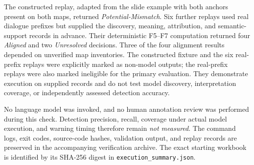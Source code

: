 The constructed replay, adapted from the slide example with both
anchors present on both maps, returned \emph{Potential-Mismatch}.
Six further replays used real dialogue prefixes but supplied the
discovery, meaning, attribution, and semantic-support records in
advance. Their deterministic F5--F7 computation returned four
\emph{Aligned} and two \emph{Unresolved} decisions. Three of the four
alignment results depended on unverified map inventories. The
constructed fixture and the six real-prefix replays were explicitly
marked as non-model outputs; the real-prefix replays were also marked
ineligible for the primary evaluation. They demonstrate execution on
supplied records and do not test model discovery, interpretation
coverage, or independently assessed detection accuracy.

No language model was invoked, and no human annotation review was
performed during this check. Detection precision, recall, coverage
under actual model execution, and warning timing therefore remain
\emph{not measured}. The command logs, exit codes, source-code hashes,
validation output, and replay records are preserved in the accompanying
verification archive. The exact starting workbook is identified by
its SHA-256 digest in \texttt{execution\_summary.json}.
